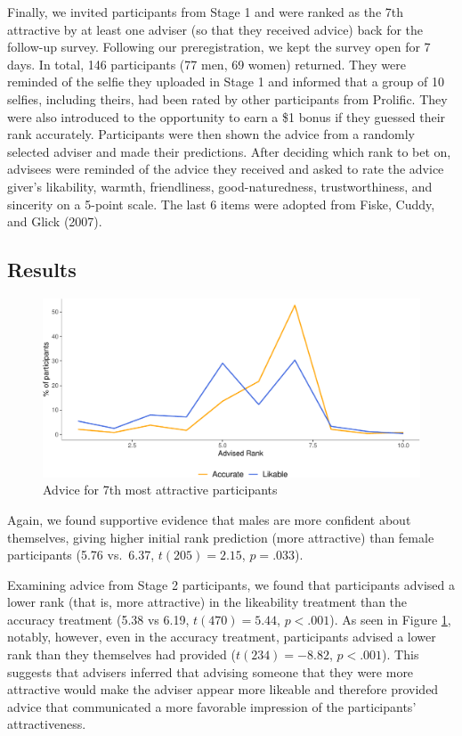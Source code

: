 \documentclass[
  man,floatsintext]{apa6}
\begin{document}
Finally, we invited participants from Stage 1 and were ranked as the 7th attractive by at least one adviser (so that they received advice) back for the follow-up survey. Following our preregistration, we kept the survey open for 7 days. In total, 146 participants (77 men, 69 women) returned. They were reminded of the selfie they uploaded in Stage 1 and informed that a group of 10 selfies, including theirs, had been rated by other participants from Prolific. They were also introduced to the opportunity to earn a \$1 bonus if they guessed their rank accurately. Participants were then shown the advice from a randomly selected adviser and made their predictions. After deciding which rank to bet on, advisees were reminded of the advice they received and asked to rate the advice giver's likability, warmth, friendliness, good-naturedness, trustworthiness, and sincerity on a 5-point scale. The last 6 items were adopted from Fiske, Cuddy, and Glick (2007).

\hypertarget{results-1}{%
\subsection{Results}\label{results-1}}

\begin{figure}

{\centering \includegraphics{Advice-Giving_files/figure-latex/study2advice-1} 

}

\caption{Advice for 7th most attractive participants}\label{fig:study2advice}
\end{figure}

Again, we found supportive evidence that males are more confident about themselves, giving higher initial rank prediction (more attractive) than female participants (5.76 vs.~6.37, \(t(205) = 2.15\), \(p = .033\)).

Examining advice from Stage 2 participants, we found that participants advised a lower rank (that is, more attractive) in the likeability treatment than the accuracy treatment (5.38 vs 6.19, \(t(470) = 5.44\), \(p < .001\)). As seen in Figure \ref{fig:study2advice}, notably, however, even in the accuracy treatment, participants advised a lower rank than they themselves had provided (\(t(234) = -8.82\), \(p < .001\)). This suggests that advisers inferred that advising someone that they were more attractive would make the adviser appear more likeable and therefore provided advice that communicated a more favorable impression of the participants' attractiveness.
\end{document}
